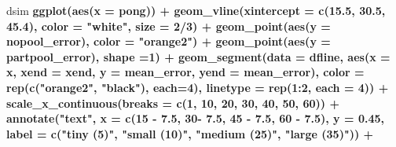 \documentclass[12pt,]{article}
\newenvironment{Shaded}{\begin{snugshade}}{\end{snugshade}}
\newcommand{\KeywordTok}[1]{\textcolor[rgb]{0.13,0.29,0.53}{\textbf{#1}}}
\newcommand{\DataTypeTok}[1]{\textcolor[rgb]{0.13,0.29,0.53}{#1}}
\newcommand{\DecValTok}[1]{\textcolor[rgb]{0.00,0.00,0.81}{#1}}
\newcommand{\FloatTok}[1]{\textcolor[rgb]{0.00,0.00,0.81}{#1}}
\newcommand{\StringTok}[1]{\textcolor[rgb]{0.31,0.60,0.02}{#1}}
\newcommand{\OperatorTok}[1]{\textcolor[rgb]{0.81,0.36,0.00}{\textbf{#1}}}
\newcommand{\NormalTok}[1]{#1}
\begin{document}
{\begin{Shaded}
\begin{Highlighting}[]
\NormalTok{dsim }\OperatorTok{%>%}
\StringTok{  }\KeywordTok{ggplot}\NormalTok{(}\KeywordTok{aes}\NormalTok{(}\DataTypeTok{x =}\NormalTok{ pong)) }\OperatorTok{+}\StringTok{ }
\StringTok{  }\KeywordTok{geom_vline}\NormalTok{(}\DataTypeTok{xintercept =} \KeywordTok{c}\NormalTok{(}\FloatTok{15.5}\NormalTok{, }\FloatTok{30.5}\NormalTok{, }\FloatTok{45.4}\NormalTok{),}
             \DataTypeTok{color =} \StringTok{"white"}\NormalTok{, }\DataTypeTok{size =} \DecValTok{2}\OperatorTok{/}\DecValTok{3}\NormalTok{) }\OperatorTok{+}\StringTok{ }
\StringTok{  }\KeywordTok{geom_point}\NormalTok{(}\KeywordTok{aes}\NormalTok{(}\DataTypeTok{y =}\NormalTok{ nopool_error), }\DataTypeTok{color =} \StringTok{"orange2"}\NormalTok{) }\OperatorTok{+}\StringTok{ }
\StringTok{  }\KeywordTok{geom_point}\NormalTok{(}\KeywordTok{aes}\NormalTok{(}\DataTypeTok{y =}\NormalTok{ partpool_error), }\DataTypeTok{shape =}\DecValTok{1}\NormalTok{) }\OperatorTok{+}\StringTok{ }
\StringTok{  }\KeywordTok{geom_segment}\NormalTok{(}\DataTypeTok{data =}\NormalTok{ dfline, }
               \KeywordTok{aes}\NormalTok{(}\DataTypeTok{x =}\NormalTok{ x, }\DataTypeTok{xend =}\NormalTok{ xend, }
               \DataTypeTok{y =}\NormalTok{ mean_error, }\DataTypeTok{yend =}\NormalTok{ mean_error),}
               \DataTypeTok{color =} \KeywordTok{rep}\NormalTok{(}\KeywordTok{c}\NormalTok{(}\StringTok{"orange2"}\NormalTok{, }\StringTok{"black"}\NormalTok{), }\DataTypeTok{each=}\DecValTok{4}\NormalTok{),}
               \DataTypeTok{linetype =} \KeywordTok{rep}\NormalTok{(}\DecValTok{1}\OperatorTok{:}\DecValTok{2}\NormalTok{, }\DataTypeTok{each =} \DecValTok{4}\NormalTok{)) }\OperatorTok{+}
\StringTok{  }\KeywordTok{scale_x_continuous}\NormalTok{(}\DataTypeTok{breaks =} \KeywordTok{c}\NormalTok{(}\DecValTok{1}\NormalTok{, }\DecValTok{10}\NormalTok{, }\DecValTok{20}\NormalTok{, }\DecValTok{30}\NormalTok{, }\DecValTok{40}\NormalTok{, }\DecValTok{50}\NormalTok{, }\DecValTok{60}\NormalTok{)) }\OperatorTok{+}
\StringTok{  }\KeywordTok{annotate}\NormalTok{(}\StringTok{"text"}\NormalTok{, }\DataTypeTok{x =} \KeywordTok{c}\NormalTok{(}\DecValTok{15} \OperatorTok{-}\StringTok{ }\FloatTok{7.5}\NormalTok{, }\DecValTok{30}\OperatorTok{-}\StringTok{ }\FloatTok{7.5}\NormalTok{, }\DecValTok{45} \OperatorTok{-}\StringTok{ }\FloatTok{7.5}\NormalTok{, }\DecValTok{60} \OperatorTok{-}\StringTok{ }\FloatTok{7.5}\NormalTok{), }\DataTypeTok{y =} \FloatTok{0.45}\NormalTok{,}
           \DataTypeTok{label =} \KeywordTok{c}\NormalTok{(}\StringTok{"tiny (5)"}\NormalTok{, }\StringTok{"small (10)"}\NormalTok{, }\StringTok{"medium (25)"}\NormalTok{, }\StringTok{"large (35)"}\NormalTok{)) }\OperatorTok{+}\StringTok{ }
}
\end{Highlighting}
\end{Shaded}}
\end{document}
